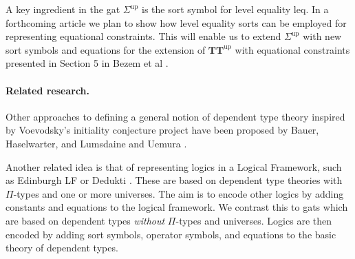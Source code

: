 \documentclass[11pt,a4paper]{article}
\theoremstyle{plain}
\theoremstyle{definition}
\def\leq{\mathrm{leq}}
\def\p{\mathrm{p}}
\def\q{\mathrm{q}}
\def\Sigmaint{{\Sigma^\mathrm{up}}}
\def\TTint{{\mathbf{TT}^\mathrm{up}}}
\begin{document}
A key ingredient in the gat $\Sigmaint$ is the sort symbol for level equality $\leq$. In a forthcoming article we plan to show how level equality sorts can be employed for representing equational constraints. This will enable us to extend $\Sigmaint$ with new sort symbols and equations for the extension of $\TTint$ with equational constraints presented in Section 5 in Bezem et al \cite{BezemCDE22}. 

%
%


\paragraph{Related research.}
Other approaches to defining a general notion of dependent type theory inspired by Voevodsky's initiality conjecture project have been proposed by Bauer, Haselwarter, and Lumsdaine \cite{BauerHL20} and Uemura \cite{Uemura23}. 

Another related idea is that of representing logics in a {Logical Framework}, such as Edinburgh LF \cite{harper-honsell-plotkin} or Dedukti \cite{dowek-dedukti}. These are based on dependent type theories with $\Pi$-types and one or more universes. The aim is to encode other logics by adding constants and equations to the logical framework. We contrast this to gats which are based on dependent types {\em without} $\Pi$-types and universes. Logics are then encoded by adding sort symbols, operator symbols, and equations to the basic theory of dependent types.
\end{document}
